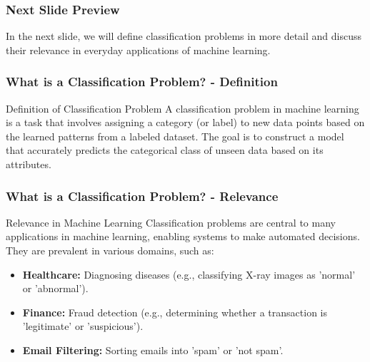 \documentclass[aspectratio=169]{beamer}
\begin{document}
\begin{frame}[fragile]
    \frametitle{Next Slide Preview}
    In the next slide, we will define classification problems in more detail and discuss their relevance in everyday applications of machine learning.
\end{frame}

\begin{frame}[fragile]
    \frametitle{What is a Classification Problem? - Definition}
    \begin{block}{Definition of Classification Problem}
        A classification problem in machine learning is a task that involves assigning a category (or label) to new data points based on the learned patterns from a labeled dataset. 
        The goal is to construct a model that accurately predicts the categorical class of unseen data based on its attributes.
    \end{block}
\end{frame}

\begin{frame}[fragile]
    \frametitle{What is a Classification Problem? - Relevance}
    \begin{block}{Relevance in Machine Learning}
        Classification problems are central to many applications in machine learning, enabling systems to make automated decisions. They are prevalent in various domains, such as:
    \end{block}
    
    \begin{itemize}
        \item \textbf{Healthcare:} Diagnosing diseases (e.g., classifying X-ray images as 'normal' or 'abnormal').
        \item \textbf{Finance:} Fraud detection (e.g., determining whether a transaction is 'legitimate' or 'suspicious').
        \item \textbf{Email Filtering:} Sorting emails into 'spam' or 'not spam'.
    \end{itemize}
\end{frame}
\end{document}
